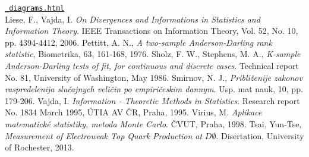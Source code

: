 \begin{thebibliography}{10}
\href{http://www-d0.fnal.gov/Run2Physics/top/top_public_web_pages/top_feynman_diagrams.html}{\texttt{\_diagrams.html}}\\
Liese, F., Vajda, I. {\em On Divergences and Informations in Statistics and Information Theory}. IEEE Transactions on Information Theory, Vol. 52, No. 10, pp. 4394-4412, 2006.
Pettitt, A. N., {\em A two-sample Anderson-Darling rank statistic}, Biometrika, 63, 161-168, 1976.
 Sholz, F. W., Stephens, M. A., {\em K-sample Anderson-Darling tests of fit, for continuous and discrete cases}. Technical report No. 81, University of Washington, May 1986.
Smirnov, N. J., {\em Približenije zakonov raspredelenija slučajnych veličin po empiričeskim dannym}. Usp. mat nauk, 10, pp. 179-206.
Vajda, I. {\em Information - Theoretic Methods in Statistics}. Research report No. 1834 March 1995, ÚTIA AV ČR, Praha, 1995.
Virius, M. {\em Aplikace matematické statistiky, metoda Monte Carlo}. ČVUT, Praha, 1998.
Tsai, Yun-Tse, {\em Measurement of Electroweak Top Quark Production at} $D\mathit{\emptyset}$. Disertation, University of Rochester, 2013.
\end{thebibliography}